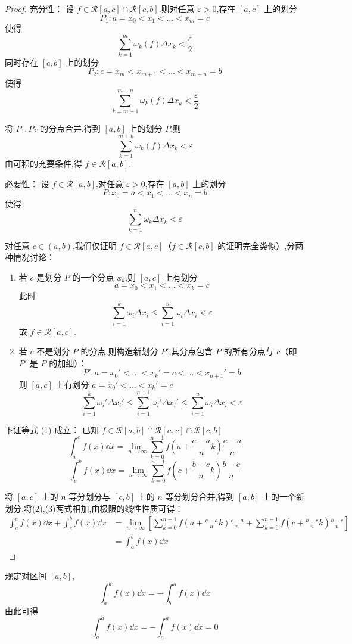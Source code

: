 \begin{proof}
	充分性：
	设 \( f \in \mathcal{R}[a,c] \cap \mathcal{R}[c,b] \).则对任意 \( \varepsilon>0 \),存在 \( [a,c] \) 上的划分
	\[
	P_1: a = x_0 < x_1 < \dots < x_m = c
	\]
	使得
	\[
	\sum_{k=1}^m \omega_k(f) \Delta x_k < \frac{\varepsilon}{2}
	\]
	同时存在 \( [c,b] \) 上的划分
	\[
	P_2: c = x_m < x_{m+1} < \dots < x_{m+n} = b
	\]
	使得
	\[
	\sum_{k=m+1}^{m+n} \omega_k(f) \Delta x_k < \frac{\varepsilon}{2}
	\]
	
	将 \( P_1, P_2 \) 的分点合并,得到 \( [a,b] \) 上的划分 \( P \),则
	\[
	\sum_{k=1}^{m+n} \omega_k(f) \Delta x_k < \varepsilon
	\]
	由可积的充要条件,得 \( f \in \mathcal{R}[a,b] \).
	
	必要性：
	设 \( f \in \mathcal{R}[a,b] \).对任意 \( \varepsilon>0 \),存在 \( [a,b] \) 上的划分
	\[
	P: x_0 = a < x_1 < \dots < x_n = b
	\]
	使得
	\[
	\sum_{k=1}^n \omega_k \Delta x_k < \varepsilon
	\]
	
	对任意 \( c \in (a,b) \),我们仅证明 \( f \in \mathcal{R}[a,c] \)（\( f \in \mathcal{R}[c,b] \) 的证明完全类似）,分两种情况讨论：
	\begin{enumerate}
		\item  若 \( c \) 是划分 \( P \) 的一个分点 \( x_k \),则 \( [a,c] \) 上有划分
		\[
		a = x_0 < x_1 < \dots < x_k = c
		\]
		此时
		\[
		\sum_{i=1}^k \omega_i \Delta x_i \leq \sum_{i=1}^n \omega_i \Delta x_i < \varepsilon
		\]
		故 \( f \in \mathcal{R}[a,c] \).
		\item 若 \( c \) 不是划分 \( P \) 的分点,则构造新划分 \( P' \),其分点包含 \( P \) 的所有分点与 \( c \)（即 \( P' \) 是 \( P \) 的加细）：
		\[
		P': a = x_0' < \dots < x_k' = c < \dots < x_{n+1}' = b
		\]
		则 \( [a,c] \) 上有划分 \( a = x_0' < \dots < x_k' = c \)
		\[
		\sum_{i=1}^k \omega_i' \Delta x_i' \leq \sum_{i=1}^{n+1} \omega_i' \Delta x_i' \leq \sum_{i=1}^n \omega_i \Delta x_i < \varepsilon
		\]
	\end{enumerate}
	
	下证等式 (1) 成立：
	已知 \( f \in \mathcal{R}[a,b] \cap \mathcal{R}[a,c] \cap \mathcal{R}[c,b] \)
	\[
	\int_a^c f(x) \dd x = \lim_{n \to \infty} \sum_{k=0}^{n-1} f\left(a + \frac{c-a}{n}k\right) \frac{c-a}{n} \tag{2}
	\]
	\[
	\int_c^b f(x) \dd x = \lim_{n \to \infty} \sum_{k=0}^{n-1} f\left(c + \frac{b-c}{n}k\right) \frac{b-c}{n} \tag{3}
	\]
	
	将 \([a,c]\) 上的 \(n\) 等分划分与 \([c,b]\) 上的 \(n\) 等分划分合并,得到 \([a,b]\) 上的一个新划分.将(2),(3)两式相加,由极限的线性性质可得：
	\[
	\begin{aligned}
		\int_a^c f(x) \dd x + \int_c^b f(x) \dd x
		&= \lim_{n \to \infty} \left[ \sum_{k=0}^{n-1} f\left(a + \frac{c-a}{n}k\right) \frac{c-a}{n} + \sum_{k=0}^{n-1} f\left(c + \frac{b-c}{n}k\right) \frac{b-c}{n} \right] \\
		&= \int_a^b f(x) \dd x
	\end{aligned}
	\]
\end{proof}
规定对区间 $[a,b]$,
\[
\int_a^b f(x)\dd x = -\int_b^a f(x)\dd x
\]
由此可得
\[
\int_a^a f(x)\dd x = -\int_a^a f(x)\dd x = 0
\]

